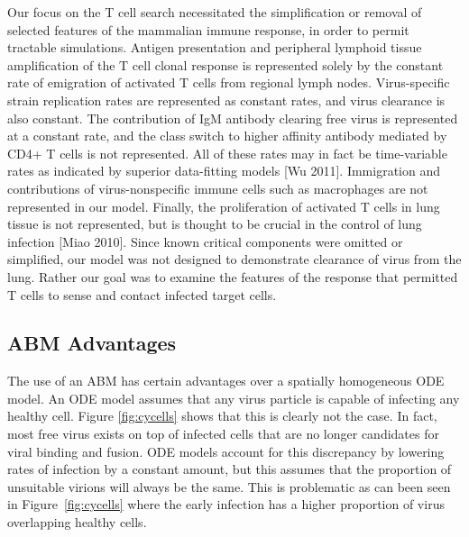 \documentclass[10pt]{article}
\begin{document}
Our focus on the T cell search necessitated the simplification or removal of selected features of the mammalian immune response, in order to permit tractable simulations.  Antigen presentation and peripheral lymphoid tissue amplification of the T cell clonal response is represented solely by the constant rate of emigration of activated T cells from regional lymph nodes.  Virus-specific strain replication rates are represented as constant rates, and virus clearance is also constant.  The contribution of IgM antibody clearing free virus is represented at a constant rate, and the class switch to higher affinity antibody mediated by CD4+ T cells is not represented.  All of these rates may in fact be time-variable rates as indicated by superior data-fitting models [Wu 2011].  Immigration and contributions of virus-nonspecific immune cells such as macrophages are not represented in our model.  Finally, the proliferation of activated T cells in lung tissue is not represented, but is thought to be crucial in the control of lung infection [Miao 2010].  Since known critical components were omitted or simplified, our model was not designed to demonstrate clearance of virus from the lung.  Rather our goal was to examine the features of the response that permitted T cells to sense and contact infected target cells.


\subsection*{ABM Advantages}

The use of an ABM has certain advantages over a spatially homogeneous ODE model.  An ODE model assumes that any virus particle is capable of infecting any healthy cell.  Figure \ref{fig:cycells} shows that this is clearly not the case.  In fact, most free virus exists on top of infected cells that are no longer candidates for viral binding and fusion.  ODE models account for this discrepancy by lowering rates of infection by a constant amount, but this assumes that the proportion of unsuitable virions will always be the same.  This is problematic as can been seen in Figure~\ref{fig:cycells} where the early infection has a higher proportion of virus overlapping healthy cells.
\end{document}
